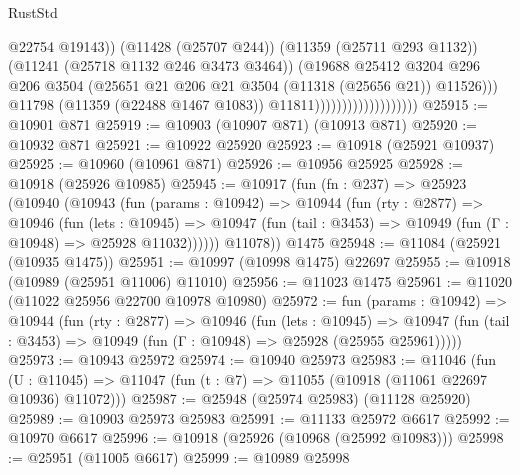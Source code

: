 \begin{lexlean}{RustStd}
\begin{coremodule}
{{{{{{{{{{{{{{{{{{{                                                @22754
                                                @19143))
                                            (@11428 (@25707 @244))
                                            (@11359 (@25711 @293 @1132))
                                            (@11241 (@25718 @1132 @246 @3473 @3464))
                                            (@19688
                                              @25412
                                              @3204
                                              @296
                                              @206
                                              @3504
                                              (@25651
                                                @21
                                                @206
                                                @21
                                                @3504
                                                (@11318 (@25656 @21))
                                                @11526)))
                                          @11798
                                          (@11359 (@22488 @1467 @1083))
                                          @11811)))))))))))))))))))
@25915 := @10901 @871
@25919 := @10903 (@10907 @871) (@10913 @871)
@25920 := @10932 @871
@25921 := @10922 @25920
@25923 := @10918 (@25921 @10937)
@25925 := @10960 (@10961 @871)
@25926 := @10956 @25925
@25928 := @10918 (@25926 @10985)
@25945 := @10917
    (fun (fn : @237) =>
    @25923
      (@10940
        (@10943
          (fun (params : @10942) =>
          @10944
            (fun (rty : @2877) =>
            @10946
              (fun (lets : @10945) =>
              @10947 (fun (tail : @3453) => @10949 (fun (Γ : @10948) => @25928 @11032))))))
        @11078))
    @1475
@25948 := @11084 (@25921 (@10935 @1475))
@25951 := @10997 (@10998 @1475) @22697
@25955 := @10918 (@10989 (@25951 @11006) @11010)
@25956 := @11023 @1475
@25961 := @11020 (@11022 @25956 @22700 @10978 @10980)
@25972 := fun (params : @10942) =>
  @10944
    (fun (rty : @2877) =>
    @10946
      (fun (lets : @10945) =>
      @10947 (fun (tail : @3453) => @10949 (fun (Γ : @10948) => @25928 (@25955 @25961)))))
@25973 := @10943 @25972
@25974 := @10940 @25973
@25983 := @11046
    (fun (U : @11045) => @11047 (fun (t : @7) => @11055 (@10918 (@11061 @22697 @10936) @11072)))
@25987 := @25948 (@25974 @25983) (@11128 @25920)
@25989 := @10903 @25973 @25983
@25991 := @11133 @25972 @6617
@25992 := @10970 @6617
@25996 := @10918 (@25926 (@10968 (@25992 @10983)))
@25998 := @25951 (@11005 @6617)
@25999 := @10989 @25998
}}}}}}}}}}}}}}}}}}}
\end{coremodule}
\end{lexlean}
